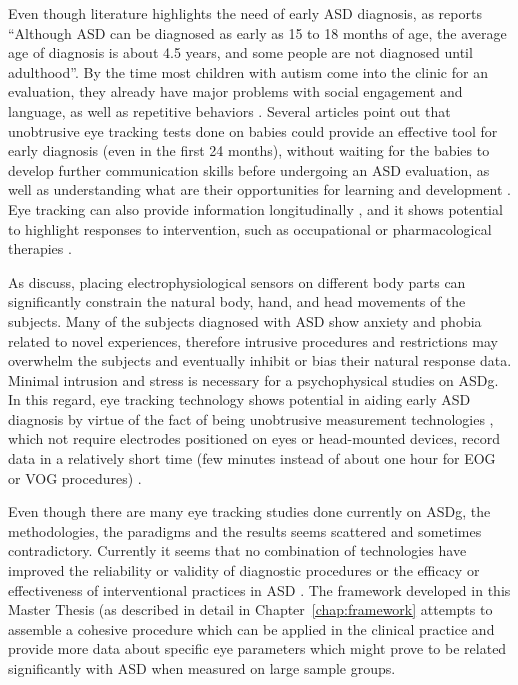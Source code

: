 Even though literature highlights the need of early ASD diagnosis, as \cite{apa2017diagnosis} reports “Although ASD can be diagnosed as early as 15 to 18 months of age, the average age of diagnosis is about 4.5 years, and some people are not diagnosed until adulthood”. By the time most children with autism come into the clinic for an evaluation, they already have major problems with social engagement and language, as well as repetitive behaviors \citep{bourzac2012development}.
Several articles \citep{boraston2007eyetrackingASD,jones2008preferencesocial,zwaigenbaum2005behaviorchildren} point out that unobtrusive eye tracking tests done on babies could provide an effective tool for early diagnosis (even in the first 24 months), without waiting for the babies to develop further communication skills before undergoing an ASD evaluation, as well as understanding what are their opportunities for learning and development \citep{falck-ytter2013eyetrackingASD}.
Eye tracking can also provide information longitudinally \citep{zwaigenbaum2005behaviorchildren}, and it shows potential to highlight responses to intervention, such as occupational  or pharmacological therapies \citep{johnson2016review}.

As \cite{samad2017markers} discuss, placing electrophysiological sensors on different body parts can significantly constrain the natural body, hand, and head movements of the subjects. Many of the subjects diagnosed with ASD show anxiety and phobia related to novel experiences, therefore intrusive procedures and restrictions may overwhelm the subjects and eventually inhibit or bias their natural response data. Minimal intrusion and stress is necessary for a psychophysical studies on ASDg. In this regard, eye tracking technology shows potential in aiding early ASD diagnosis by virtue of the fact of being unobtrusive measurement technologies \citep{bolte2016detection,falck-ytter2013eyetrackingASD}, which not require electrodes positioned on eyes or head-mounted devices, record data in a relatively short time (few minutes instead of about one hour for EOG or VOG procedures) \citep{giordano2017eyetrackersystem}.

Even though there are many eye tracking studies done currently on ASDg, the methodologies, the paradigms and the results seems scattered and sometimes contradictory. Currently  it seems that no combination of technologies have improved the reliability or validity of diagnostic procedures or the efficacy or effectiveness of interventional practices in ASD \cite{bolte2016detection}. The framework developed in this Master Thesis (as described in detail in Chapter~\ref{chap:framework} attempts to assemble a cohesive procedure which can be applied in the clinical practice and provide more data about specific eye parameters which might prove to be related significantly with ASD when measured on large sample groups.

